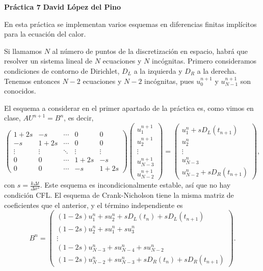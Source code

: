 \documentclass[a4paper, 12pt, oneside]{report}
\begin{document}
\noindent \textbf{Práctica 7} \hfill \textbf{David López del Pino}

\hfill

En esta práctica se implementan varios esquemas en diferencias finitas implícitos para la ecuación del calor. 

Si llamamos $N$ al número de puntos de la discretización en espacio, habrá que resolver un sistema lineal de $N$ ecuaciones y $N$ incógnitas. Primero consideramos condiciones de contorno de Dirichlet, $D_L$ a la izquierda y $D_R$ a la derecha. Tenemos entonces $N-2$ ecuaciones y $N-2$ incógnitas, pues $u_0^{n+1}$ y $u_{N-1}^{n+1}$ son conocidos. 

El esquema a considerar en el primer apartado de la práctica es, como vimos en clase, $AU^{n+1} = B^n$, es decir,
\[\left(\begin{array}{ccccc}
    1+2s & -s & \cdots & 0 & 0 \\
    -s & 1+2s & \cdots & 0 & 0 \\
    \vdots & \vdots & \ddots & \vdots & \vdots \\
    0 & 0 & \cdots & 1+2s & -s \\
    0 & 0 & \cdots & -s & 1+2s
\end{array}\right)\left(\begin{array}{c}
    u_1^{n+1} \\
    u_2^{n+1} \\
    \vdots \\
    u_{N-3}^{n+1} \\
    u_{N-2}^{n+1}
\end{array}\right) = \left(\begin{array}{c}
    u_1^n + sD_L(t_{n+1}) \\
    u_2^n \\
    \vdots \\
    u_{N-3}^n \\
    u_{N-2}^n + sD_R(t_{n+1})
\end{array}\right),\]
con $s = \frac{k\Delta t}{\Delta x^2}$. Este esquema es incondicionalmente estable, así que no hay condición CFL. El esquema de Crank-Nicholson tiene la misma matriz de coeficientes que el anterior, y el término independiente es
\[B^n = \left(\begin{array}{c}
    (1-2s)u_1^n + su_2^n + sD_L(t_n)+sD_L(t_{n+1}) \\
    (1-2s)u_2^n + su_1^n + su_3^n \\
    \vdots \\
    (1-2s)u_{N-3}^n + su_{N-4}^n + su_{N-2}^n  \\
    (1-2s)u_{N-2}^n + su_{N-3}^n + sD_R(t_n)+sD_R(t_{n+1})
\end{array}\right).\]
\end{document}
